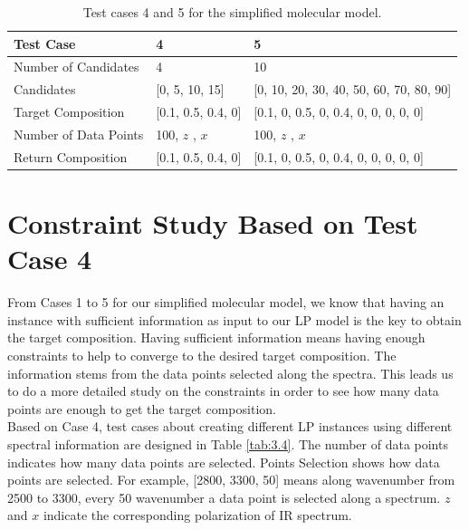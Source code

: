 \begin{table}[ht!] \small 
\begin{center}
{\def\arraystretch{1.5}
\begin{tabular}{| l | p{3cm} | p{6cm} |}
\hline
Test Case & 4 & 5\\
\hline
Number of Candidates & 4 & 10 \\
\hline
Candidates & [0, 5, 10, 15] & [0, 10, 20, 30, 40, 50, 60, 70, 80, 90] \\
\hline
Target Composition & [0.1, 0.5, 0.4, 0] & [0.1, 0, 0.5, 0, 0.4, 0, 0, 0, 0, 0]\\
\hline
Number of Data Points & 100, $z$ \newline 100, $x$ & 100, $z$ \newline 100, $x$\\
\hline
Return Composition & [0.1, 0.5, 0.4, 0] & [0.1, 0, 0.5, 0, 0.4, 0, 0, 0, 0, 0] \\
\hline
\end{tabular}
} 
\caption{Test cases 4 and 5 for the simplified molecular model.}\label{tab:3.3}
\end{center}
\end{table}		

\section{Constraint Study Based on Test Case 4}

From Cases 1 to 5 for our simplified molecular model, we know that having an instance with sufficient information as input to our LP model is the key to obtain the target composition. Having sufficient information means having enough constraints to help to converge to the desired target composition. The information stems from the data points selected along the spectra. This leads us to do a more detailed study on the constraints in order to see how many data points are enough to get the target composition.\\ 

Based on Case 4, test cases about creating different LP instances using different spectral information are designed in Table \ref{tab:3.4}. The number of data points indicates how many data points are selected. Points Selection shows how data points are selected. For example, [2800, 3300, 50] means along wavenumber from 2500 to 3300, every 50 wavenumber a data point is selected along a spectrum. $z$ and $x$ indicate the corresponding polarization of IR spectrum. \\

